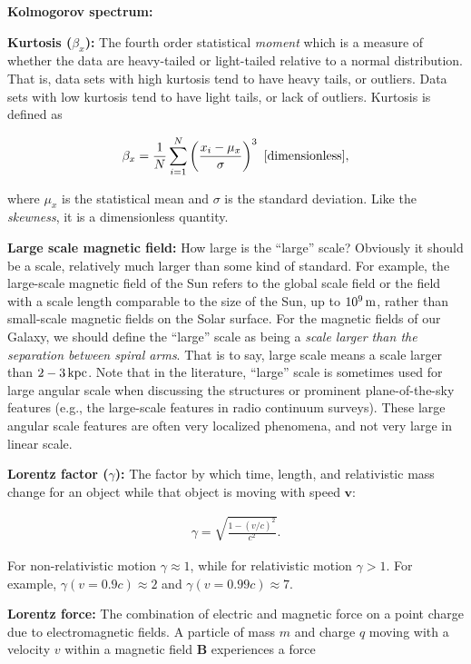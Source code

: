 \documentclass[a4paper,10pt]{article}
\begin{document}
{\noindent}\textbf{Kolmogorov spectrum:}

{\noindent}\textbf{Kurtosis ($\beta_x$):} The fourth order statistical \textit{moment} which is a measure of whether the data are heavy-tailed or light-tailed relative to a normal distribution. That is, data sets with high kurtosis tend to have heavy tails, or outliers. Data sets with low kurtosis tend to have light tails, or lack of outliers. Kurtosis is defined as

\begin{align*}
    \beta_x = \frac{1}{N} \sum_{i=1}^N \left(\frac{x_i-\mu_x}{\sigma}\right)^3 ~ [{\rm dimensionless}],
\end{align*}

{\noindent}where $\mu_x$ is the statistical mean and $\sigma$ is the standard deviation. Like the \textit{skewness}, it is a dimensionless quantity.

{\noindent}\textbf{Large scale magnetic field:} How large is the ``large'' scale? Obviously it should be a scale, relatively much larger than some kind of standard. For example, the large-scale magnetic field of the Sun refers to the global scale field or the field with a scale length comparable to the size of the Sun, up to $10^9\,{\rm m}$, rather than small-scale magnetic fields on the Solar surface. For the magnetic fields of our Galaxy, we should define the ``large'' scale as being a \textit{scale larger than the separation between spiral arms}. That is to say, large scale means a scale larger than $2-3\,{\rm kpc}$. Note that in the literature, ``large'' scale is sometimes used for large angular scale when discussing the structures or prominent plane-of-the-sky features (e.g., the large-scale features in radio continuum surveys). These large angular scale features are often very localized phenomena, and not very large in linear scale.

{\noindent}\textbf{Lorentz factor ($\gamma$):} The factor by which time, length, and relativistic mass change for an object while that object is moving with speed $\mathbf{v}$:

\begin{align*}
    \gamma = \sqrt{\frac{1-(v/c)^2}{c^2}}.
\end{align*}

{\noindent}For non-relativistic motion $\gamma\approx1$, while for relativistic motion $\gamma>1$. For example, $\gamma(v=0.9c)\approx2$ and $\gamma(v=0.99c)\approx7$.

{\noindent}\textbf{Lorentz force:} The combination of electric and magnetic force on a point charge due to electromagnetic fields. A particle of mass $m$ and charge $q$ moving with a velocity $v$ within a magnetic field $\mathbf{B}$ experiences a force 
\end{document}
